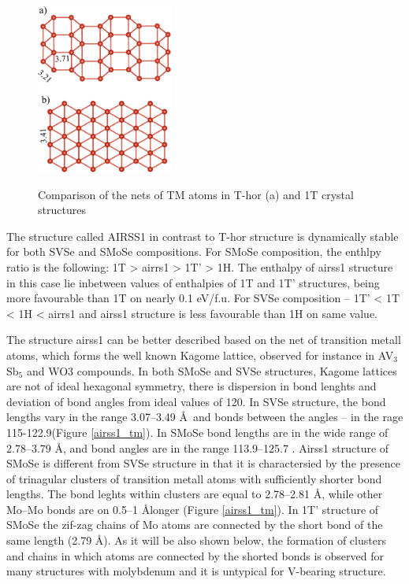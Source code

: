 \documentclass[a4paperm]{article}
\begin{document}
\begin{figure}[H]
	\includegraphics[width=0.4\textwidth]{T_hor_V.png} \\
	\caption{Comparison of the nets of TM atoms in T-hor (a) and 1T crystal structures }
	\label{T_hor_V}
\end{figure}


The structure called AIRSS1 in contrast to T-hor structure is dynamically stable for both SVSe and SMoSe compositions.
For SMoSe composition, the enthlpy ratio is the following: 1T > airrs1 > 1T' > 1H.
The enthalpy of airss1 structure in this case lie inbetween values of enthalpies of 1T and 1T' structures, being more favourable than 1T on nearly 0.1 eV/f.u.
For SVSe composition -- 1T' < 1T < 1H < airrs1 and airss1 structure is less favourable than 1H on same value.

The structure airss1 can be better described based on the net of transition metall atoms, which forms the well known Kagome lattice\cite{zhang2021_kagome}, observed for instance in AV$_3$Sb$_5$ \cite{ortiz2021} and WO3 \cite{gerand1979} compounds.
In both SMoSe and SVSe structures, Kagome lattices are not of ideal hexagonal symmetry, there is dispersion in bond lenghts and deviation of bond angles from ideal values of 120\textdegree.
In SVSe  structure, the bond lengths vary in the range 3.07--3.49 \AA\ and bonds between the angles – in the rage 115-122.9\textdegree (Figure \ref{airss1_tm}).
In SMoSe bond lengths are in the wide range of 2.78--3.79 \AA, and bond angles are in the range 113.9--125.7 \textdegree.
Airss1 structure of SMoSe is different from SVSe structure in that it is charactersied by the presence of trinagular clusters of transition metall atoms with sufficiently shorter bond lengths.
The bond leghts within clusters are equal to 2.78--2.81 \AA, while other Mo--Mo bonds are on 0.5--1 \AA longer (Figure \ref{airss1_tm}).
In 1T' structure of SMoSe the zif-zag chains of Mo atoms are connected by the short bond of the same length (2.79 \AA).
As it will be also shown below, the formation of clusters and chains in which atoms are connected by the shorted bonds is observed for many structures with molybdenum and it is untypical for V-bearing structure.
\end{document}
